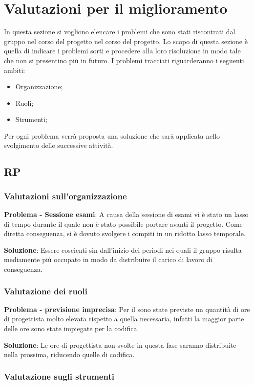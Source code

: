 \section{Valutazioni per il miglioramento}
In questa sezione si vogliono elencare i problemi che sono stati riscontrati dal gruppo nel corso del progetto nel corso del progetto. Lo scopo di questa sezione è quella di indicare i problemi sorti e procedere alla loro risoluzione in modo tale che non si presentino più in futuro.
I problemi tracciati riguarderanno i seguenti ambiti:
\begin{itemize}
\item Organizzazione;
\item Ruoli;
\item Strumenti;
\end{itemize}
Per ogni problema verrà proposta una soluzione che sarà applicata nello svolgimento delle successive attività.

\subsection{RP}
\subsubsection{Valutazioni sull'organizzazione}
\textbf{Problema - Sessione esami}: A causa della sessione di esami vi è stato un lasso di tempo durante il quale non è stato possibile portare avanti il progetto. Come diretta conseguenza, si è dovuto svolgere i compiti in un ridotto lasso temporale.

\textbf{Soluzione}: Essere coscienti sin dall'inizio dei periodi nei quali il gruppo risulta mediamente più occupato in modo da distribuire il carico di lavoro di conseguenza. 

\subsubsection{Valutazione dei ruoli}

\textbf{Problema - previsione imprecisa}: Per il  sono state previste un quantità di ore di progettista molto elevata rispetto a quella necessaria, infatti la maggior parte delle ore sono state impiegate per la codifica.

\textbf{Soluzione}: Le ore di progettista non svolte in questa fase saranno distribuite nella prossima, riducendo quelle di codifica.


\subsubsection{Valutazione sugli strumenti}

